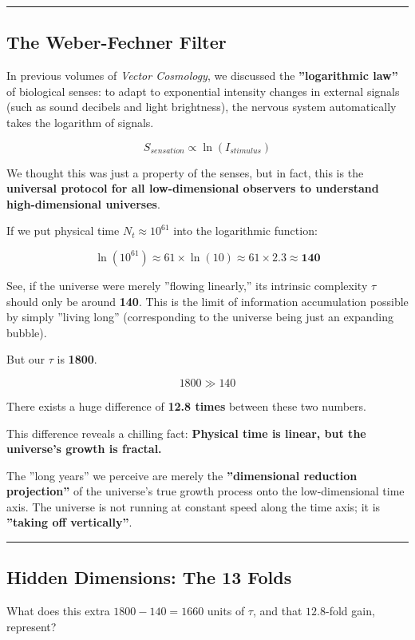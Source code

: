 \hrule

\subsection{The Weber-Fechner Filter}

In previous volumes of \textit{Vector Cosmology}, we discussed the \textbf{''logarithmic law''} of biological senses: to adapt to exponential intensity changes in external signals (such as sound decibels and light brightness), the nervous system automatically takes the logarithm of signals.

$$S_{sensation} \propto \ln(I_{stimulus})$$

We thought this was just a property of the senses, but in fact, this is the \textbf{universal protocol for all low-dimensional observers to understand high-dimensional universes}.

If we put physical time $N_t \approx 10^{61}$ into the logarithmic function:

$$\ln(10^{61}) \approx 61 \times \ln(10) \approx 61 \times 2.3 \approx \mathbf{140}$$

See, if the universe were merely ''flowing linearly,'' its intrinsic complexity $\tau$ should only be around \textbf{140}. This is the limit of information accumulation possible by simply ''living long'' (corresponding to the universe being just an expanding bubble).

But our $\tau$ is \textbf{1800}.

$$1800 \gg 140$$

There exists a huge difference of \textbf{12.8 times} between these two numbers.

This difference reveals a chilling fact: \textbf{Physical time is linear, but the universe's growth is fractal.}

The ''long years'' we perceive are merely the \textbf{''dimensional reduction projection''} of the universe's true growth process onto the low-dimensional time axis. The universe is not running at constant speed along the time axis; it is \textbf{''taking off vertically''}.

\hrule

\subsection{Hidden Dimensions: The 13 Folds}

What does this extra $1800 - 140 = 1660$ units of $\tau$, and that $12.8$-fold gain, represent?

